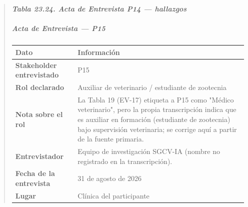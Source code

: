 \documentclass[
]{article}
\newcounter{none} %
\begin{document}
\begin{quote}
\protect{}\label{_bookmark_P14_hallazgos}{}\emph{\textbf{Tabla 23.24. Acta de Entrevista P14 --- hallazgos}}

\subparagraph{Acta de Entrevista --- P15}\label{acta-entrevista-p15}

{\def\LTcaptype{none} %
\begin{longtable}[]{|
  >{\raggedright\arraybackslash}p{}|
  >{\raggedright\arraybackslash}p{}|}
\hline
\begin{minipage}[b]{\linewidth}\centering
\textbf{Dato}
\end{minipage} & \begin{minipage}[b]{\linewidth}\centering
\textbf{Información}
\end{minipage} \\
\hline
\endhead
\hline
\endlastfoot
\textbf{Stakeholder entrevistado} & \begin{minipage}[t]{\linewidth}\raggedright
P15
\end{minipage} \\
\hline
\textbf{Rol declarado} & \begin{minipage}[t]{\linewidth}\raggedright
Auxiliar de veterinario / estudiante de zootecnia
\end{minipage} \\
\hline
\textbf{Nota sobre el rol} & \begin{minipage}[t]{\linewidth}\raggedright
La Tabla 19 (EV-17) etiqueta a P15 como "Médico veterinario", pero la propia transcripción indica que es auxiliar en formación (estudiante de zootecnia) bajo supervisión veterinaria; se corrige aquí a partir de la fuente primaria.
\end{minipage} \\
\hline
\textbf{Entrevistador} & \begin{minipage}[t]{\linewidth}\raggedright
Equipo de investigación SGCV-IA (nombre no registrado en la transcripción).
\end{minipage} \\
\hline
\textbf{Fecha de la entrevista} & \begin{minipage}[t]{\linewidth}\raggedright
31 de agosto de 2026
\end{minipage} \\
\hline
\textbf{Lugar} & \begin{minipage}[t]{\linewidth}\raggedright
Clínica del participante
\end{minipage} \\

\end{longtable}}
\end{quote}
\end{document}
